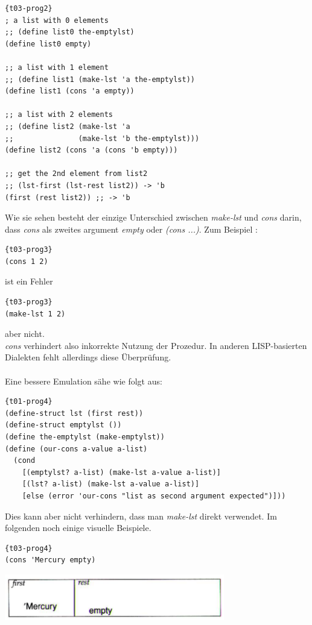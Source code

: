 \begin{lstlisting}{t03-prog2}
; a list with 0 elements
;; (define list0 the-emptylst)
(define list0 empty)

;; a list with 1 element
;; (define list1 (make-lst 'a the-emptylst))
(define list1 (cons 'a empty))

;; a list with 2 elements
;; (define list2 (make-lst 'a
;;               (make-lst 'b the-emptylst)))
(define list2 (cons 'a (cons 'b empty)))

;; get the 2nd element from list2
;; (lst-first (lst-rest list2)) -> 'b
(first (rest list2)) ;; -> 'b
\end{lstlisting}

Wie sie sehen besteht der einzige Unterschied zwischen \textit{make-lst} und \textit{cons} darin, dass \textit{cons} als zweites argument \textit{empty} oder \textit{(cons ...)}. Zum Beispiel :

\begin{lstlisting}{t03-prog3}
(cons 1 2)
\end{lstlisting}
ist ein Fehler
\begin{lstlisting}{t03-prog3}
(make-lst 1 2)
\end{lstlisting}
aber nicht.\\
\textit{cons} verhindert also inkorrekte Nutzung der Prozedur. In anderen LISP-basierten Dialekten fehlt allerdings diese Überprüfung. \\\\
Eine bessere Emulation sähe wie folgt aus:

\begin{lstlisting}{t01-prog4}
(define-struct lst (first rest))
(define-struct emptylst ())
(define the-emptylst (make-emptylst))
(define (our-cons a-value a-list)
  (cond
    [(emptylst? a-list) (make-lst a-value a-list)]
    [(lst? a-list) (make-lst a-value a-list)]
    [else (error 'our-cons "list as second argument expected")]))
\end{lstlisting}
Dies kann aber nicht verhindern, dass man \textit{make-lst} direkt verwendet. Im folgenden noch einige visuelle Beispiele.

\begin{lstlisting}{t03-prog4}
(cons 'Mercury empty)
\end{lstlisting}
\includegraphics[height=2cm]{Bilder/T03_00.png}

